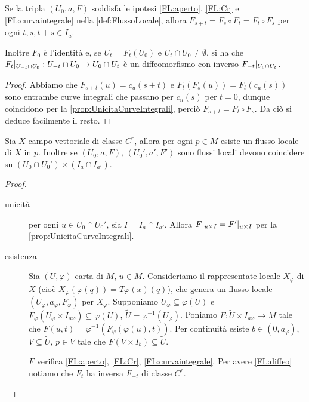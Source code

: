 \begin{proposition}
	Se la tripla $(U_0,a,F)$ soddisfa le ipotesi \ref{FL:aperto}, \ref{FL:Cr} e \ref{FL:curvaintegrale} nella \cref{def:FlussoLocale}, allora $F_{s+t}=F_s\circ F_t=F_t\circ F_s$ per ogni $t,s,t+s\in I_a$.
	
	Inoltre $F_0$ è l'identità e, se $U_t=F_t(U_0)$ e $U_t\cap U_0\ne\emptyset$, si ha che $F_t|_{U_{-t}\cap U_0}:U_{-t}\cap U_0\to U_0\cap U_t$ è un diffeomorfismo con inverso $F_{-t}|_{U_0\cap U_t}$.
\end{proposition}

\begin{proof}
	Abbiamo che $F_{s+t}(u)=c_u(s+t)$ e $F_t(F_s(u))=F_t(c_u(s))$ sono entrambe curve integrali che passano per $c_u(s)$ per $t=0$, dunque coincidono per la \cref{prop:UnicitaCurveIntegrali}, perciò $F_{s+t}=F_t\circ F_s$. Da ciò si deduce facilmente il resto.
\end{proof}


\begin{proposition} 
	Sia $X$ campo vettoriale di classe $C^r$, allora per ogni $p\in M$ esiste un flusso locale di $X$ in $p$. Inoltre se $(U_0,a,F)$, $(U_0',a',F')$ sono flussi locali devono coincidere su $(U_0\cap U_0')\times (I_a\cap I_{a'})$.
\end{proposition}
\begin{proof}
	\begin{description}
	\item [unicità]
	per ogni $u\in U_0\cap U_0'$, sia $I=I_a\cap I_{a'}$. Allora $F|_{{u}\times I}=F'|_{{u}\times I}$ per la \cref{prop:UnicitaCurveIntegrali}.
	
	\item [esistenza]
	Sia $(U,\varphi)$ carta di $M$, $u\in M$. Consideriamo il rappresentate locale $X_\varphi$ di $X$ (cioè $X_\varphi(\varphi(q))=T\varphi(x)(q)$), che genera un flusso locale $(U_\varphi,a_\varphi,F_\varphi)$ per $X_\varphi$.
	Supponiamo $U_\varphi\subseteq \varphi(U)$ e $F_\varphi(U_\varphi\times I_{a\varphi})\subseteq \varphi(U)$, $\tilde U=\varphi^{-1}(U_\varphi)$.
	Poniamo  $F:\tilde U\times I_{a\varphi}\to M$ tale che $F(u,t)=\varphi^{-1}(F_\varphi(\varphi(u),t))$.
	Per continuità esiste $b\in(0,a_\varphi)$, $V\subseteq \tilde U$, $p\in V$ tale che $F(V\times I_b)\subseteq \tilde U$.
	
	$F$ verifica \ref{FL:aperto}, \ref{FL:Cr}, \ref{FL:curvaintegrale}. Per avere \ref{FL:diffeo} notiamo che $F_t$ ha inversa $F_{-t}$ di classe $C^r$.
	\end{description}
\end{proof}


